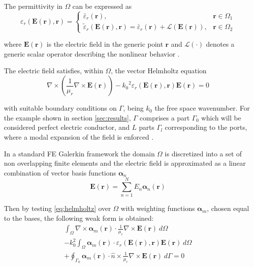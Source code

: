 \documentclass[journal]{IEEEtran}
\renewcommand{\vec}[1]{\mathbf{#1}}
\begin{document}
The permittivity in $\Omega$ can be expressed as 
%
\begin{equation}
\varepsilon_r(\vec{E}(\vec{r}),\vec{r})\!=\! 
\begin{cases}
\bar{\varepsilon}_r(\vec{r}), & \vec{r} \in \Omega_1 \\
\tilde{\varepsilon}_r(\vec{E}(\vec{r}), \vec{r}) \!=\!
\bar{\varepsilon}_r(\vec{r}) \!+\! \mathcal{L}(\vec{E}(\vec{r})), & \vec{r} \in
\Omega_2
\end{cases}
\end{equation} 

\noindent where $\vec{E}(\vec{r})$ is the electric field in the generic point
$\vec{r}$ and $\mathcal{L}(\cdot)$ denotes a generic scalar operator describing the
nonlinear behavior \cite{Guarnieri2010}. 

The electric field satisfies, within $\Omega$, the vector Helmholtz equation
%
\begin{equation}
\label{eq:helmholtz}
\nabla \times \left ( \frac{1}{\mu_r} \nabla \times \vec{E}(\vec{r}) \right )  - {k_0}^2 \varepsilon_r \left(\vec{E}(\vec{r}), \vec{r} \right) \vec{E}(\vec{r}) = 0
\end{equation} 

\noindent with suitable boundary conditions on $\Gamma$, being $k_0$ the free
space wavenumber. For the example shown in section \ref{sec:results}, $\Gamma$
comprises a part $\Gamma_0$ which will be considered perfect electric conductor, and $L$ parts $\Gamma_l$
corresponding to the ports, where a modal expansion of the field is enforced \cite{Pelosi2009}.

In a standard FE Galerkin framework the domain $\Omega$ is
discretized into a set of non overlapping finite elements and the electric
field is approximated as a linear combination of vector basis functions $\boldsymbol{\alpha}_n$
%
\begin{equation}\label{e:femexpansion}
\vec{E}(\vec{r})  = \sum_{n=1}^N E_n \boldsymbol{\alpha}_n(\vec{r})
\end{equation} 

Then by testing \eqref{eq:helmholtz} over $\Omega$ with weighting functions
 $\boldsymbol{\alpha}_m$, chosen equal to the bases, the following weak form is
 obtained:
%
\begin{multline}\label{eq:fem}
\int_\Omega \nabla \times \boldsymbol{\alpha}_m (\vec{r}) \cdot \frac{1}{\mu_r} \nabla \times \vec{E}(\vec{r}) \ d\Omega \\
- k_0^2 \int_\Omega  \boldsymbol{\alpha}_m (\vec{r}) \cdot \varepsilon_r (\vec{E}(\vec{r}), \vec{r}) \vec{E}(\vec{r}) \ d\Omega \\
+ \oint_{\Gamma_0} \boldsymbol{\alpha}_m (\vec{r}) \cdot \hat{n} \times \frac{1}{\mu_r} \nabla \times \vec{E}(\vec{r}) \ d\Gamma = 0
\end{multline} 
\end{document}
